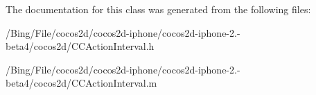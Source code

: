 The documentation for this class was generated from the following files\-:\begin{DoxyCompactItemize}
\item 
/\-Bing/\-File/cocos2d/cocos2d-\/iphone/cocos2d-\/iphone-\/2.-\/beta4/cocos2d/C\-C\-Action\-Interval.\-h\item 
/\-Bing/\-File/cocos2d/cocos2d-\/iphone/cocos2d-\/iphone-\/2.-\/beta4/cocos2d/C\-C\-Action\-Interval.\-m\end{DoxyCompactItemize}
